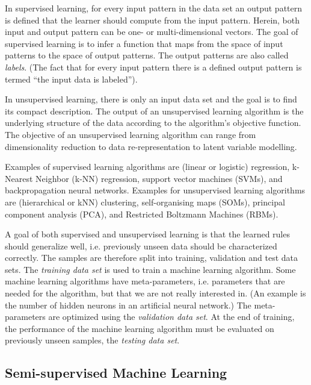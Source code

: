 In supervised learning, for every input pattern in the data set an
output pattern is defined that the learner should compute from the
input pattern. Herein, both input and output pattern can be one- or
multi-dimensional vectors. The goal of supervised learning is to infer
a function that maps from the space of input patterns to the space
of output patterns. The output patterns are also called \emph{labels}.
(The fact that for every input pattern there is a defined output pattern
is termed ``the input data is labeled'').

In unsupervised learning, there is only an input data set and the
goal is to find its compact description. The output of an unsupervised
learning algorithm is the underlying structure of the data according
to the algorithm's objective function. The objective of an unsupervised
learning algorithm can range from dimensionality reduction to data
re-representation to latent variable modelling.

Examples of supervised learning algorithms are (linear or logistic)
regression, k-Nearest Neighbor (k-NN) regression, support vector machines
(SVMs), and backpropagation neural networks. Examples for unsupervised
learning algorithms are (hierarchical or kNN) clustering, self-organising
maps (SOMs), principal component analysis (PCA), and Restricted Boltzmann
Machines (RBMs).

A goal of both supervised and unsupervised learning is that the learned
rules should generalize well, i.e. previously unseen data should be
characterized correctly. The samples are therefore split into training,
validation and test data sets. The \emph{training data set}
is used to train a machine learning algorithm. Some machine learning
algorithms have meta-parameters, i.e. parameters that are needed for
the algorithm, but that we are not really interested in. (An example
is the number of hidden neurons in an artificial neural network.)
The meta-parameters are optimized using the \emph{validation data
set}. At the end of training, the performance
of the machine learning algorithm must be evaluated on previously
unseen samples, the \emph{testing data set}.

\subsection{Semi-supervised Machine Learning}

